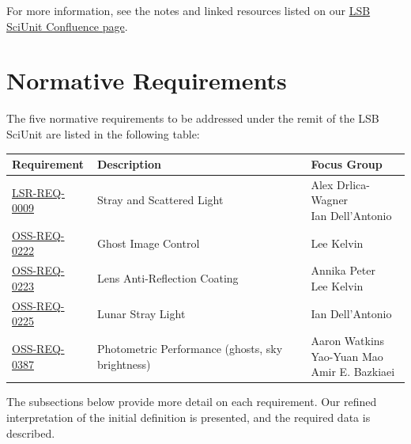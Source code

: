 \documentclass[SE,authoryear,toc]{lsstdoc}
\begin{document}
For more information, see the notes and linked resources listed on our \href{https://ls.st/sciunit-lsb}{LSB SciUnit Confluence page}.

\newpage





\section{Normative Requirements}  \label{sec:requirements}

The five normative requirements to be addressed under the remit of the LSB SciUnit are listed in the following table:

\addtocounter{table}{-1}
\begin{longtable}{p{}p{}p{}}\hline
\textbf{Requirement} & \textbf{Description} & \textbf{Focus Group}  \\\hline
\href{https://docushare.lsst.org/docushare/dsweb/Get/LSE-29\#page=29}{LSR-REQ-0009} & Stray and Scattered Light & \Centerstack[l]{Alex Drlica-Wagner \\ Ian Dell'Antonio} \\
\rowcolor{lightgrey}\href{https://docushare.lsst.org/docushare/dsweb/Get/LSE-30\#page=169}{OSS-REQ-0222} & Ghost Image Control & Lee Kelvin \\
\href{https://docushare.lsst.org/docushare/dsweb/Get/LSE-30\#page=170}{OSS-REQ-0223} & Lens Anti-Reflection Coating & \Centerstack[l]{Annika Peter \\ Lee Kelvin} \\
\rowcolor{lightgrey}\href{https://docushare.lsst.org/docushare/dsweb/Get/LSE-30\#page=171}{OSS-REQ-0225} & Lunar Stray Light & Ian Dell'Antonio \\
\href{https://docushare.lsst.org/docushare/dsweb/Get/LSE-30\#page=124}{OSS-REQ-0387} & Photometric Performance (ghosts, sky brightness) & \Centerstack[l]{Aaron Watkins \\ Yao-Yuan Mao \\ Amir E. Bazkiaei} \\\hline
\end{longtable}

The subsections below provide more detail on each requirement.
Our refined interpretation of the initial definition is presented, and the required data is described.

\newpage
\end{document}
